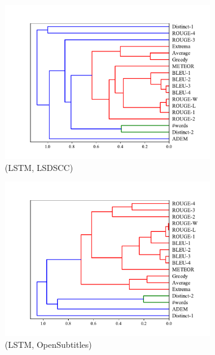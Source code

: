 \begin{figure}[htb]
\begin{subfigure}{0.40\linewidth}
        \includegraphics[width=\linewidth]{figure/plot/hierarchy/v2/pearson/lstm/lsdscc/plot.pdf}
        \caption{(LSTM, LSDSCC)}
    \end{subfigure}%
    \begin{subfigure}{0.40\linewidth}
        \centering
        \includegraphics[width=\linewidth]{figure/plot/hierarchy/v2/pearson/lstm/opensub/plot.pdf}
        \caption{(LSTM, OpenSubtitles)}
    \end{subfigure}%
    \begin{subfigure}{0.40\linewidth}
        \centering

\end{subfigure}
\end{figure}
